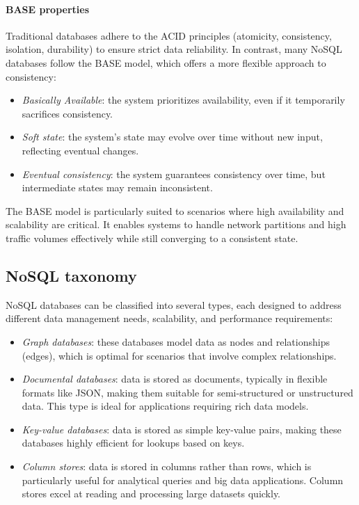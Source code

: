 \paragraph*{BASE properties}
Traditional databases adhere to the ACID principles (atomicity, consistency, isolation, durability) to ensure strict data reliability. 
In contrast, many NoSQL databases follow the BASE model, which offers a more flexible approach to consistency:
\begin{itemize}
    \item \textit{Basically Available}: the system prioritizes availability, even if it temporarily sacrifices consistency.
    \item \textit{Soft state}: the system's state may evolve over time without new input, reflecting eventual changes.
    \item \textit{Eventual consistency}: the system guarantees consistency over time, but intermediate states may remain inconsistent.
\end{itemize}
The BASE model is particularly suited to scenarios where high availability and scalability are critical. 
It enables systems to handle network partitions and high traffic volumes effectively while still converging to a consistent state.

\subsection{NoSQL taxonomy}
NoSQL databases can be classified into several types, each designed to address different data management needs, scalability, and performance requirements:
\begin{itemize}
    \item \textit{Graph databases}: these databases model data as nodes and relationships (edges), which is optimal for scenarios that involve complex relationships.
    \item \textit{Documental databases}: data is stored as documents, typically in flexible formats like JSON, making them suitable for semi-structured or unstructured data. 
        This type is ideal for applications requiring rich data models.
    \item \textit{Key-value databases}: data is stored as simple key-value pairs, making these databases highly efficient for lookups based on keys.
    \item \textit{Column stores}: data is stored in columns rather than rows, which is particularly useful for analytical queries and big data applications. 
        Column stores excel at reading and processing large datasets quickly.
\end{itemize}